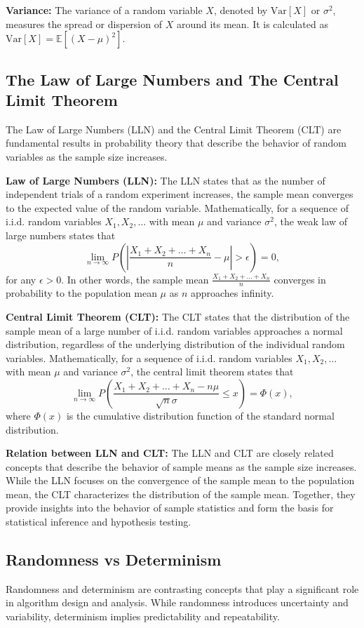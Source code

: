 \documentclass[12pt]{book} %
\begin{document}
\textbf{Variance:} The variance of a random variable \(X\), denoted by \(\text{Var}[X]\) or \(\sigma^2\), measures the spread or dispersion of \(X\) around its mean. It is calculated as \(\text{Var}[X] = \mathbb{E}[(X - \mu)^2]\).

\subsection{The Law of Large Numbers and The Central Limit Theorem}
The Law of Large Numbers (LLN) and the Central Limit Theorem (CLT) are fundamental results in probability theory that describe the behavior of random variables as the sample size increases.

\textbf{Law of Large Numbers (LLN):} The LLN states that as the number of independent trials of a random experiment increases, the sample mean converges to the expected value of the random variable. Mathematically, for a sequence of i.i.d. random variables \(X_1, X_2, \ldots\) with mean \(\mu\) and variance \(\sigma^2\), the weak law of large numbers states that
\[
\lim_{n \to \infty} P\left(\left|\frac{X_1 + X_2 + \ldots + X_n}{n} - \mu\right| > \epsilon\right) = 0,
\]
for any \(\epsilon > 0\). In other words, the sample mean \(\frac{X_1 + X_2 + \ldots + X_n}{n}\) converges in probability to the population mean \(\mu\) as \(n\) approaches infinity.

\textbf{Central Limit Theorem (CLT):} The CLT states that the distribution of the sample mean of a large number of i.i.d. random variables approaches a normal distribution, regardless of the underlying distribution of the individual random variables. Mathematically, for a sequence of i.i.d. random variables \(X_1, X_2, \ldots\) with mean \(\mu\) and variance \(\sigma^2\), the central limit theorem states that
\[
\lim_{n \to \infty} P\left(\frac{X_1 + X_2 + \ldots + X_n - n\mu}{\sqrt{n}\sigma} \leq x\right) = \Phi(x),
\]
where \(\Phi(x)\) is the cumulative distribution function of the standard normal distribution.

\textbf{Relation between LLN and CLT:} The LLN and CLT are closely related concepts that describe the behavior of sample means as the sample size increases. While the LLN focuses on the convergence of the sample mean to the population mean, the CLT characterizes the distribution of the sample mean. Together, they provide insights into the behavior of sample statistics and form the basis for statistical inference and hypothesis testing.

\subsection{Randomness vs Determinism}
Randomness and determinism are contrasting concepts that play a significant role in algorithm design and analysis. While randomness introduces uncertainty and variability, determinism implies predictability and repeatability.
\end{document}
